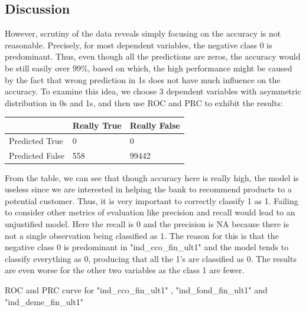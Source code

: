 \documentclass{article}
\begin{document}
\begin{spacing}{1}
\begin{large}
\subsection{Discussion}

However, scrutiny of the data reveals simply focusing on the accuracy is not reasonable. Precisely, for most dependent variables, the negative class 0 is predominant. Thus, even though all the predictions are zeros, the accuracy would be still easily over 99\%, based on which, the high performance might be caused by the fact that wrong prediction in 1s does not have much influence on the accuracy. To examine this idea, we choose 3 dependent variables with asymmetric distribution in 0s and 1s, and then use ROC and PRC to exhibit the results:

\vspace{5mm}
\begin{tabular}{| l | l | l |}
	\hline
	& Really True & Really False \\ \hline
	Predicted True & 0 & 0 \\ \hline
	Predicted False & 558 & 99442\\
	\hline
\end{tabular}
\vspace{5mm}

From the table, we can see that though accuracy here is really high, the model is  useless since we are  interested in helping the bank to recommend products to a potential customer. Thus, it is very important to correctly classify 1 as 1. Failing to consider other metrics of evaluation like precision and recall would lead to an unjustified model. Here the recall is 0 and the precision is NA because there is not a single observation being classified as 1. The reason for this is that the negative class 0 is predominant in "ind\_cco\_fin\_ult1" and the model tends to classify everything as 0, producing that all the 1’s are classified as 0. The results are even worse for the other two variables as the class 1 are fewer.

ROC and PRC curve for "ind\_cco\_fin\_ult1" , "ind\_fond\_fin\_ult1" and "ind\_deme\_fin\_ult1"


\end{large}
\end{spacing}
\end{document}
